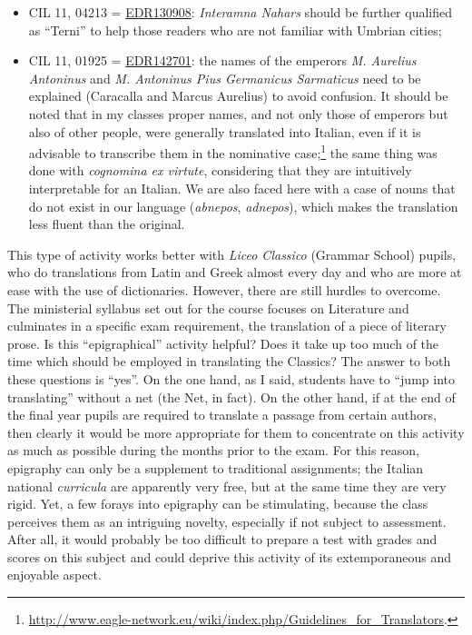 \documentclass[amsthm,ebook]{saparticle}
\begin{document}
\begin{itemize}
\item  CIL 11, 04213 = \href{http://www.edr-edr.it/edr\_programmi/res\_complex\_comune.php?do=book\&id\_nr=EDR130908}{EDR130908}: \emph{Interamna Nahars} should be further qualified as ``Terni'' to
help those readers who are not familiar with Umbrian cities;

\item CIL 11, 01925 = \href{http://www.edr-edr.it/edr\_programmi/res\_complex\_comune.php?do=book\&id\_nr=EDR142701}{EDR142701}: the names of the emperors \emph{M. Aurelius Antoninus} and \emph{M.
Antoninus Pius Germanicus Sarmaticus} need to be explained (Caracalla and Marcus Aurelius) to avoid confusion. It should
be noted that in my classes proper names, and not only those of emperors but also of other people, were generally
translated into Italian, even if it is advisable to transcribe them in the nominative case;\footnote{
\url{http://www.eagle-network.eu/wiki/index.php/Guidelines\_for\_Translators}.} the same thing was done with \emph{cognomina ex
virtute}, considering that they are intuitively interpretable for an Italian. We are also faced here with a case of nouns that do not exist in our language (\emph{abnepos}, \emph{adnepos}), which makes the translation less fluent than the original.
\end{itemize}





This type of activity works better with \emph{Liceo Classico} (Grammar School) pupils, who do translations from Latin and Greek
almost every day and who are more at ease with the use of dictionaries. However, there are still hurdles to overcome.
The ministerial syllabus set out for the course focuses on Literature and culminates in a specific exam requirement,
the translation of a piece of literary prose. Is this ``epigraphical'' activity helpful? Does it take up too much of the
time which should be employed in translating the Classics? The answer to both these questions is ``yes''. On the one
hand, as I said, students have to ``jump into translating'' without a net (the Net, in fact). On the other hand, if at
the end of the final year pupils are required to translate a passage from certain authors, then clearly it would be
more appropriate for them to concentrate on this activity as much as possible during the months prior to the exam. For
this reason, epigraphy can only be a supplement to traditional assignments; the Italian national \emph{curricula} are
apparently very free, but at the same time they are very rigid. Yet, a few forays into epigraphy can be stimulating,
because the class perceives them as an intriguing novelty, especially if not subject to assessment. After all, it would
probably be too difficult to prepare a test with grades and scores on this subject and could deprive this activity of
its extemporaneous and enjoyable aspect.
\end{document}

